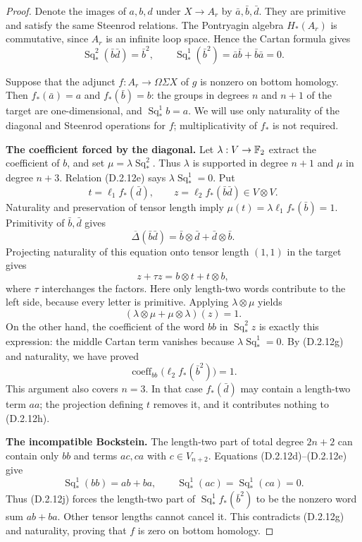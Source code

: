 \begin{proof}
Denote the images of $a,b,d$ under $X\to A_r$ by
$\bar a,\bar b,\bar d$. They are primitive and satisfy the
same Steenrod relations. The Pontryagin algebra $H_*(A_r)$
is commutative, since $A_r$ is an infinite loop space. Hence
the Cartan formula gives
\[
 \operatorname{Sq}_*^2(\bar b\bar d)=\bar b^2,
 \qquad
 \operatorname{Sq}_*^1(\bar b^2)
   =\bar a\bar b+\bar b\bar a=0.
 \tag{D.2.12g}
\]

Suppose that the adjunct $f:A_r\to\Omega\Sigma X$ of $g$
is nonzero on bottom homology. Then $f_*(\bar a)=a$ and
$f_*(\bar b)=b$: the groups in degrees $n$ and $n+1$ of
the target are one-dimensional, and
$\operatorname{Sq}_*^1b=a$. We will use only naturality of
the diagonal and Steenrod operations for $f$; multiplicativity
of $f_*$ is not required.

\medskip\noindent
\textbf{The coefficient forced by the diagonal.}
Let $\lambda:V\to\mathbb F_2$ extract the coefficient of $b$,
and set $\mu=\lambda\operatorname{Sq}_*^2$.
Thus $\lambda$ is supported in degree $n+1$ and $\mu$ in
degree $n+3$. Relation \textup{(D.2.12e)} says
$\lambda\operatorname{Sq}_*^1=0$.
Put
\[
 t=\ell_1f_*(\bar d),\qquad
 z=\ell_2f_*(\bar b\bar d)\in V\otimes V.
\]
Naturality and preservation of tensor length imply
$\mu(t)=\lambda\ell_1f_*(\bar b)=1$.
Primitivity of $\bar b,\bar d$ gives
\[
 \overline\Delta(\bar b\bar d)
    =\bar b\otimes\bar d+\bar d\otimes\bar b.
\]
Projecting naturality of this equation onto tensor length
$(1,1)$ in the target gives
\[
 z+\tau z=b\otimes t+t\otimes b,
 \tag{D.2.12h}
\]
where $\tau$ interchanges the factors. Here only length-two
words contribute to the left side, because every letter is
primitive. Applying $\lambda\otimes\mu$ yields
\[
 (\lambda\otimes\mu+\mu\otimes\lambda)(z)=1.
 \tag{D.2.12i}
\]
On the other hand, the coefficient of the word $bb$ in
$\operatorname{Sq}_*^2z$ is exactly this expression: the
middle Cartan term vanishes because
$\lambda\operatorname{Sq}_*^1=0$. By
\textup{(D.2.12g)} and naturality, we have proved
\[
 \operatorname{coeff}_{bb}\bigl(\ell_2f_*(\bar b^2)\bigr)=1.
 \tag{D.2.12j}
\]
This argument also covers $n=3$. In that case $f_*(\bar d)$
may contain a length-two term $aa$; the projection defining
$t$ removes it, and it contributes nothing to
\textup{(D.2.12h)}.

\medskip\noindent
\textbf{The incompatible Bockstein.}
The length-two part of total degree $2n+2$ can contain only
$bb$ and terms $ac,ca$ with $c\in V_{n+2}$. Equations
\textup{(D.2.12d)--(D.2.12e)} give
\[
 \operatorname{Sq}_*^1(bb)=ab+ba,\qquad
 \operatorname{Sq}_*^1(ac)=
 \operatorname{Sq}_*^1(ca)=0.
\]
Thus \textup{(D.2.12j)} forces the length-two part of
$\operatorname{Sq}_*^1f_*(\bar b^2)$ to be the nonzero word
sum $ab+ba$. Other tensor lengths cannot cancel it. This
contradicts \textup{(D.2.12g)} and naturality, proving that
$f$ is zero on bottom homology.


\end{proof}
